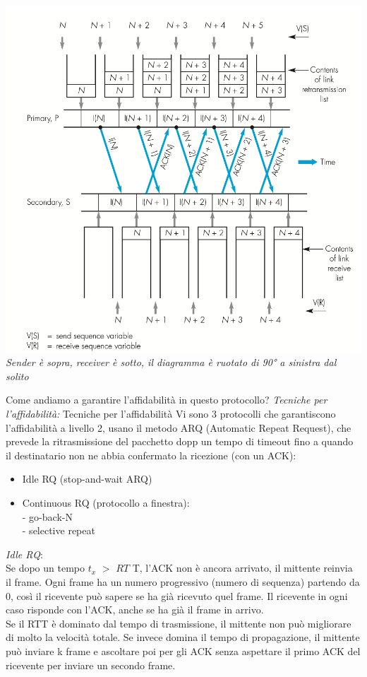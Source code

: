 \documentclass[11pt, oneside]{article}   	%
\begin{document}
\begin{center}
\includegraphics[scale=0.5]{m1}\\
\emph{Sender è sopra, receiver è sotto, il diagramma è ruotato di 90° a sinistra dal solito}
\end{center}
\long{}
Come andiamo a garantire l'affidabilità in questo protocollo?
\emph{Tecniche per l'affidabilità:}
Tecniche per l'affidabilità
Vi sono 3 protocolli che garantiscono l'affidabilità a livello 2, usano il metodo ARQ (Automatic Repeat Request), che prevede la ritrasmissione del pacchetto dopp un tempo di timeout fino a quando il destinatario non ne abbia confermato la ricezione (con un ACK):
\begin{itemize}
\item Idle RQ (stop-and-wait ARQ)
\item Continuous RQ (protocollo a finestra): \\
- go-back-N \\
- selective repeat\\
\end{itemize}
\emph{Idle RQ}:\\
Se dopo un tempo $t_x$ $>$ $RT$ T, l'ACK non è ancora arrivato, il mittente reinvia il frame. Ogni frame ha un numero progressivo (numero di sequenza) partendo da 0, così il ricevente può sapere se ha già ricevuto quel frame. Il ricevente in ogni caso risponde con l'ACK, anche se ha già il frame in arrivo.\\ Se il RTT è dominato dal tempo di trasmissione, il mittente non può migliorare di molto la velocità totale.
Se invece domina il tempo di propagazione, il mittente può inviare k frame e ascoltare poi per gli ACK senza aspettare il primo ACK del ricevente per inviare un secondo frame.\\\\
\end{document}
